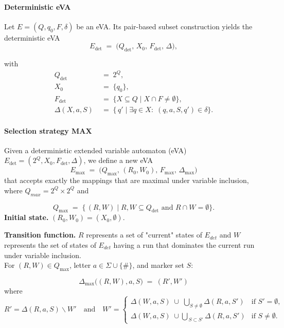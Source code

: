 \paragraph{Deterministic eVA}
Let \(E=(Q,q_{0},F,\delta)\) be an eVA.
Its pair-based subset construction yields the deterministic eVA
\[
  E_{\det}\;=\;
  \bigl(Q_{\det},\,X_{0},\,F_{\det},\,\Delta\bigr),
\]

with
\begin{align*}
  Q_{\det}      &\;=\; 2^{Q},\\
  X_{0}         &\;=\; \{q_{0}\}, \\
  F_{\det}      &\;=\; \{X\subseteq Q \mid X\cap F\neq\emptyset\},\\
  \Delta(X,a,S) &\;=\; \{\,q' \mid \exists q\in X:\;(q,a,S,q')\in\delta\}.
\end{align*}


\paragraph{Selection strategy MAX}
Given a deterministic extended variable automaton (eVA)
$E_{\det}=(2^{Q},X_{0},F_{\det},\Delta)$, we define a new eVA 
$$
  E_{\max}\;=\;
  \bigl(Q_{\max},\,(R_{0},W_{0}),\,F_{\max},\,\Delta_{\max}\bigr)
$$
that accepts exactly the mappings that are maximal under variable inclusion, where $Q_{max} = 2^Q \times 2^Q$ and 

$$
  Q_{\max}
  \;=\;
  \bigl\{\, (R,W)\mid R,W\subseteq Q_{\det}
                 \text{ and } R\cap W=\emptyset \bigr\}.
$$
\medskip
\noindent
\textbf{Initial state.}\;
\((R_{0},W_{0}) = (X_{0},\emptyset)\).

\medskip
\noindent
\textbf{Transition function.} $R$ represents a set of "current" states of $E_{det}$ and $W$ represents the set of states of $E_{det}$ having a run that dominates the current run under variable inclusion.\\
For \((R,W)\in Q_{\max}\), letter \(a\in\Sigma\cup\{\#\}\),  
and marker set \(S\):


$$
  \Delta_{\max}\bigl((R,W),a,S\bigr)
  \;=\  (R',W')
$$
where
$$
  R'=\Delta(R,a,S) \backslash W'
  \quad\text{and}\quad
  W'=\begin{cases}
        \displaystyle
        \Delta(W,a,S)\;\cup\;\bigcup_{S\neq\emptyset}\!\Delta(R,a,S') &
            \text{if } S'=\emptyset,\\[6pt]
        \displaystyle
        \Delta(W,a,S)\;\cup\!
        \bigcup_{\,S \subset S'}\!\Delta(R,a,S') &
            \text{if } S\neq\emptyset.
      \end{cases}
$$

